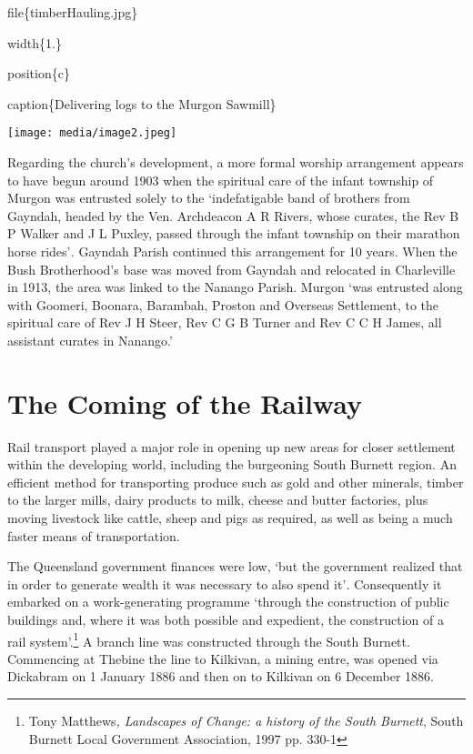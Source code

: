 file\{timberHauling.jpg\}

width\{1.\}

position\{c\}

caption\{Delivering logs to the Murgon Sawmill\}

\texttt{[image: media/image2.jpeg]}

Regarding the church's development, a more formal worship arrangement appears to have begun around 1903 when the spiritual care of the infant township of Murgon was entrusted solely to the `indefatigable band of brothers from Gayndah, headed by the Ven. Archdeacon A R Rivers, whose curates, the Rev B P Walker and J L Puxley, passed through the infant township on their marathon horse rides'\emph{.} Gayndah Parish continued this arrangement for 10 years. When the Bush Brotherhood's base was moved from Gayndah and relocated in Charleville in 1913, the area was linked to the Nanango Parish. Murgon `was entrusted along with Goomeri, Boonara, Barambah, Proston and Overseas Settlement, to the spiritual care of Rev J H Steer, Rev C G B Turner and Rev C C H James, all assistant curates in Nanango.'

\hypertarget{the-coming-of-the-railway}{%
\section{The Coming of the Railway}\label{the-coming-of-the-railway}}

Rail transport played a major role in opening up new areas for closer settlement within the developing world, including the burgeoning South Burnett region. An efficient method for transporting produce such as gold and other minerals, timber to the larger mills, dairy products to milk, cheese and butter factories, plus moving livestock like cattle, sheep and pigs as required, as well as being a much faster means of transportation.

The Queensland government finances were low, `but the government realized that in order to generate wealth it was necessary to also spend it'\emph{.} Consequently it embarked on a work-generating programme `through the construction of public buildings and, where it was both possible and expedient, the construction of a rail system'.\footnote{Tony Matthews\emph{, Landscapes of Change: a history of the South Burnett}, South Burnett Local Government Association, 1997 pp. 330-1} A branch line was constructed through the South Burnett. Commencing at Thebine the line to Kilkivan, a mining entre, was opened via Dickabram on 1 January 1886 and then on to Kilkivan on 6 December 1886.

